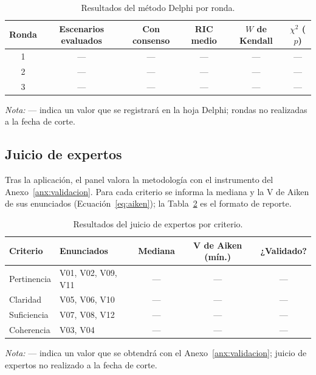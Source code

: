 \begin{table}[htbp]
  \centering
  \caption{Resultados del método Delphi por ronda.}
  \label{tab:delphi_rondas}
  \footnotesize
  \renewcommand{\arraystretch}{1.2}
  \begin{tabular}{|c|c|c|c|c|c|}
    \hline
    \textbf{Ronda} & \textbf{Escenarios evaluados} & \textbf{Con consenso} & \textbf{RIC medio} & \textbf{$W$ de Kendall} & \textbf{$\chi^2$ ($p$)} \\
    \hline
    1 & --- & --- & --- & --- & --- \\ \hline
    2 & --- & --- & --- & --- & --- \\ \hline
    3 & --- & --- & --- & --- & --- \\ \hline
  \end{tabular}
  \par\vspace{2pt}
  \raggedright
  \textit{Nota:} --- indica un valor que se registrará en la hoja Delphi; rondas no realizadas a la fecha de corte.
\end{table}

\subsection{Juicio de expertos}

Tras la aplicación, el panel valora la metodología con el instrumento del Anexo~\ref{anx:validacion}. Para cada criterio se informa la mediana y la V de Aiken de sus enunciados (Ecuación~\ref{eq:aiken}); la Tabla~\ref{tab:juicio_expertos} es el formato de reporte.

\begin{table}[htbp]
  \centering
  \caption{Resultados del juicio de expertos por criterio.}
  \label{tab:juicio_expertos}
  \footnotesize
  \renewcommand{\arraystretch}{1.2}
  \begin{tabular}{|l|l|c|c|c|}
    \hline
    \textbf{Criterio} & \textbf{Enunciados} & \textbf{Mediana} & \textbf{V de Aiken (mín.)} & \textbf{¿Validado?} \\
    \hline
    Pertinencia & V01, V02, V09, V11 & --- & --- & --- \\ \hline
    Claridad & V05, V06, V10 & --- & --- & --- \\ \hline
    Suficiencia & V07, V08, V12 & --- & --- & --- \\ \hline
    Coherencia & V03, V04 & --- & --- & --- \\ \hline
  \end{tabular}
  \par\vspace{2pt}
  \raggedright
  \textit{Nota:} --- indica un valor que se obtendrá con el Anexo~\ref{anx:validacion}; juicio de expertos no realizado a la fecha de corte.
\end{table}

